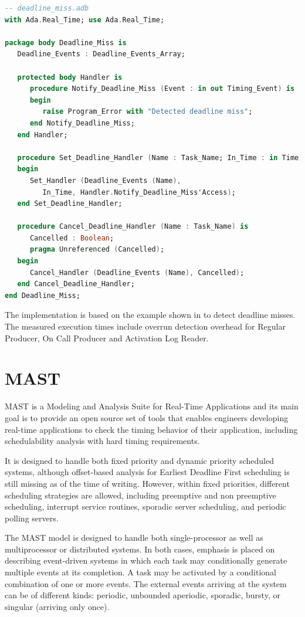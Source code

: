 \documentclass{article}
\begin{document}
\begin{lstlisting}[language=Ada]
-- deadline_miss.adb
with Ada.Real_Time; use Ada.Real_Time;

package body Deadline_Miss is
   Deadline_Events : Deadline_Events_Array;

   protected body Handler is
      procedure Notify_Deadline_Miss (Event : in out Timing_Event) is
      begin
         raise Program_Error with "Detected deadline miss";
      end Notify_Deadline_Miss;
   end Handler;

   procedure Set_Deadline_Handler (Name : Task_Name; In_Time : in Time) is
   begin
      Set_Handler (Deadline_Events (Name),
         In_Time, Handler.Notify_Deadline_Miss'Access);
   end Set_Deadline_Handler;

   procedure Cancel_Deadline_Handler (Name : Task_Name) is
      Cancelled : Boolean;
      pragma Unreferenced (Cancelled);
   begin
      Cancel_Handler (Deadline_Events (Name), Cancelled);
   end Cancel_Deadline_Handler;
end Deadline_Miss;
\end{lstlisting}

The implementation is based on the example shown in \cite{overrundetection} to detect deadline misses. The measured execution times include overrun detection overhead for Regular Producer, On Call Producer and Activation Log Reader.

\section{MAST}

MAST \cite{mast} is a Modeling and Analysis Suite for Real-Time Applications and its main goal is to provide an open source set of tools that enables engineers developing real-time applications to check the timing behavior of their application, including schedulability analysis with hard timing requirements.

It is designed to handle both fixed priority and dynamic priority scheduled systems, although offset-based analysis for Earliest Deadline First scheduling is still missing as of the time of writing. However, within fixed priorities, different scheduling strategies are allowed, including preemptive and non preemptive scheduling, interrupt service routines, sporadic server scheduling, and periodic polling servers.

The MAST model is designed to handle both single-processor as well as multiprocessor or distributed systems. In both cases, emphasis is placed on describing event-driven systems in which each task may conditionally generate multiple events at its completion. A task may be activated by a conditional combination of one or more events. The external events arriving at the system can be of different kinds: periodic, unbounded aperiodic, sporadic, bursty, or singular (arriving only once).
\end{document}
